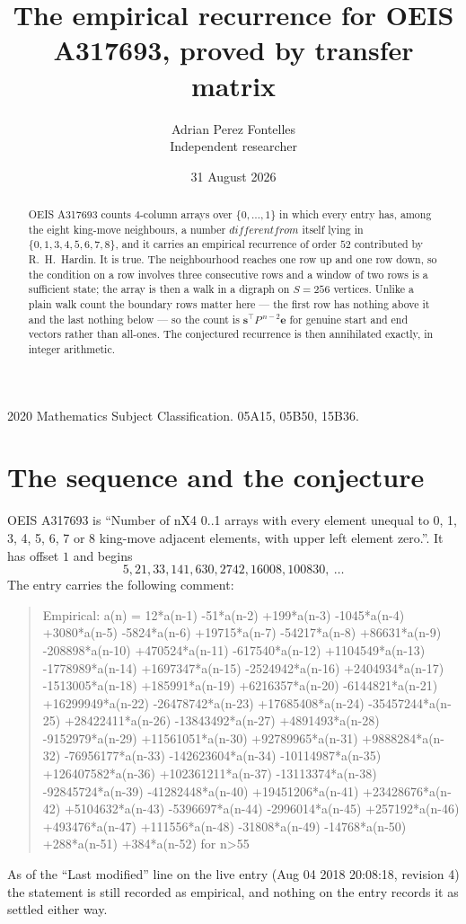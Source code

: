 \documentclass[11pt,a4paper]{article}
\title{The empirical recurrence for OEIS A317693, proved by transfer matrix}
\author{Adrian Perez Fontelles\\ \small Independent researcher}
\date{31 August 2026}
\theoremstyle{plain}
\theoremstyle{definition}
\begin{document}
\maketitle

\begin{abstract}
OEIS A317693 counts $4$-column arrays over $\{0,\dots,1\}$ in which every entry has,
among the eight king-move neighbours, a number $different from$ itself lying in $\{0,1,3,4,5,6,7,8\}$, and it carries an empirical
recurrence of order $52$ contributed by R.~H.~Hardin. It is true. The neighbourhood
reaches one row up and one row down, so the condition on a row involves three consecutive
rows and a window of two rows is a sufficient state; the array is then a walk in a digraph
on $S=256$ vertices. Unlike a plain walk count the boundary rows matter here --- the first
row has nothing above it and the last nothing below --- so the count is
$\mathbf{s}^{\!\top}P^{\,n-2}\mathbf{e}$ for genuine start and end vectors rather than
all-ones. The conjectured recurrence is then annihilated exactly, in integer arithmetic.
\end{abstract}

\noindent\small 2020 Mathematics Subject Classification. 05A15, 05B50, 15B36.\normalsize

\section{The sequence and the conjecture}

OEIS A317693 is ``Number of nX4 0..1 arrays with every element unequal to 0, 1, 3, 4, 5, 6, 7 or 8 king-move adjacent elements, with upper left element zero.''. It has offset
$1$ and begins
\[
5, 21, 33, 141, 630, 2742, 16008, 100830,\ \dots
\]
The entry carries the following comment:
\begin{quote}\small
Empirical: a(n) = 12*a(n-1) -51*a(n-2) +199*a(n-3) -1045*a(n-4) +3080*a(n-5) -5824*a(n-6) +19715*a(n-7) -54217*a(n-8) +86631*a(n-9) -208898*a(n-10) +470524*a(n-11) -617540*a(n-12) +1104549*a(n-13) -1778989*a(n-14) +1697347*a(n-15) -2524942*a(n-16) +2404934*a(n-17) -1513005*a(n-18) +185991*a(n-19) +6216357*a(n-20) -6144821*a(n-21) +16299949*a(n-22) -26478742*a(n-23) +17685408*a(n-24) -35457244*a(n-25) +28422411*a(n-26) -13843492*a(n-27) +4891493*a(n-28) -9152979*a(n-29) +11561051*a(n-30) +92789965*a(n-31) +9888284*a(n-32) -76956177*a(n-33) -142623604*a(n-34) -10114987*a(n-35) +126407582*a(n-36) +102361211*a(n-37) -13113374*a(n-38) -92845724*a(n-39) -41282448*a(n-40) +19451206*a(n-41) +23428676*a(n-42) +5104632*a(n-43) -5396697*a(n-44) -2996014*a(n-45) +257192*a(n-46) +493476*a(n-47) +111556*a(n-48) -31808*a(n-49) -14768*a(n-50) +288*a(n-51) +384*a(n-52) for n>55
\end{quote}
As of the ``Last modified'' line on the live entry (Aug 04 2018 20:08:18, revision
4) the statement is still recorded as empirical, and nothing on the entry
records it as settled either way.
\end{document}
